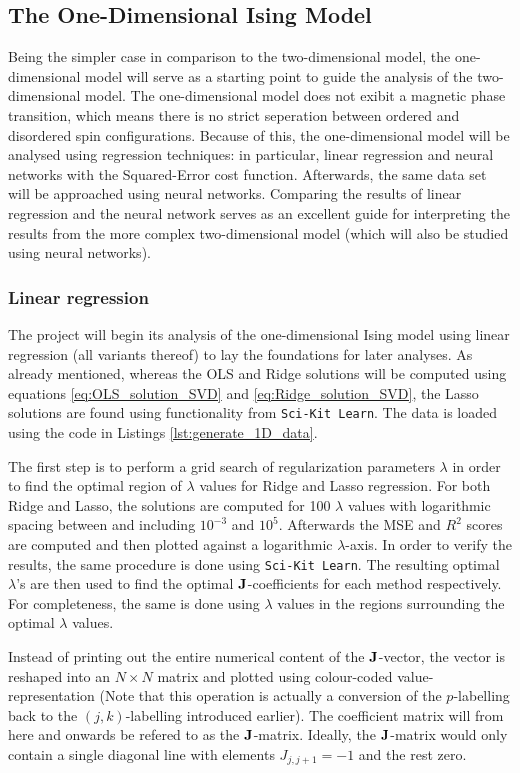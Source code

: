 \documentclass[nofootinbib,reprint,english]{revtex4-1}
\begin{document}
\subsection{The One-Dimensional Ising Model}
Being the simpler case in comparison to the two-dimensional model, the one-dimensional model will serve as a starting point to guide the analysis of the two-dimensional model. The one-dimensional model does not exibit a magnetic phase transition, which means there is no strict seperation between ordered and disordered spin configurations. Because of this, the one-dimensional model will be analysed using regression techniques: in particular, linear regression and neural networks with the Squared-Error cost function. Afterwards, the same data set will be approached using neural networks. Comparing the results of linear regression and the neural network serves as an excellent guide for interpreting the results from the more complex two-dimensional model (which will also be studied using neural networks).
\subsubsection{Linear regression}
The project will begin its analysis of the one-dimensional Ising model using linear regression (all variants thereof) to lay the foundations for later analyses. As already mentioned, whereas the OLS and Ridge solutions will be computed using equations \eqref{eq:OLS_solution_SVD} and \eqref{eq:Ridge_solution_SVD}, the Lasso solutions are found using functionality from \texttt{Sci-Kit Learn}. The data is loaded using the code in Listings \ref{lst:generate_1D_data}.

The first step is to perform a grid search of regularization parameters \(\lambda\) in order to find the optimal region of \(\lambda\) values for Ridge and Lasso regression. For both Ridge and Lasso, the solutions are computed for 100 \(\lambda\) values with logarithmic spacing between and including \(10^{-3}\) and \(10^5\). Afterwards the MSE and \(R^2\) scores are computed and then plotted against a logarithmic \(\lambda\)-axis. In order to verify the results, the same procedure is done using \texttt{Sci-Kit Learn}. The resulting optimal \(\lambda\)'s are then used to find the optimal \(\vb{J}\)-coefficients for each method respectively. For completeness, the same is done using \(\lambda\) values in the regions surrounding the optimal \(\lambda\) values.

Instead of printing out the entire numerical content of the \(\vb{J}\)-vector, the vector is reshaped into an \(N\times N\) matrix and plotted using colour-coded value-representation (Note that this operation is actually a conversion of the \(p\)-labelling back to the \((j,k)\)-labelling introduced earlier). The coefficient matrix will from here and onwards be refered to as the \(\vb{J}\)-matrix. Ideally, the \(\vb{J}\)-matrix would only contain a single diagonal line with elements \(J_{j,j+1}=-1\) and the rest zero.
\end{document}
